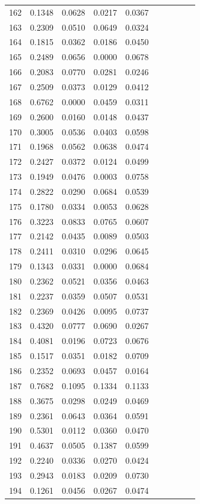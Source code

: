 \begin{table}
\begin{tabular}{cccccccccc}
162& 0.1348& 0.0628& 0.0217& 0.0367\\ 
163& 0.2309& 0.0510& 0.0649& 0.0324\\ 
164& 0.1815& 0.0362& 0.0186& 0.0450\\ 
165& 0.2489& 0.0656& 0.0000& 0.0678\\ 
166& 0.2083& 0.0770& 0.0281& 0.0246\\ 
167& 0.2509& 0.0373& 0.0129& 0.0412\\ 
168& 0.6762& 0.0000& 0.0459& 0.0311\\ 
169& 0.2600& 0.0160& 0.0148& 0.0437\\ 
170& 0.3005& 0.0536& 0.0403& 0.0598\\ 
171& 0.1968& 0.0562& 0.0638& 0.0474\\ 
172& 0.2427& 0.0372& 0.0124& 0.0499\\ 
173& 0.1949& 0.0476& 0.0003& 0.0758\\ 
174& 0.2822& 0.0290& 0.0684& 0.0539\\ 
175& 0.1780& 0.0334& 0.0053& 0.0628\\ 
176& 0.3223& 0.0833& 0.0765& 0.0607\\ 
177& 0.2142& 0.0435& 0.0089& 0.0503\\ 
178& 0.2411& 0.0310& 0.0296& 0.0645\\ 
179& 0.1343& 0.0331& 0.0000& 0.0684\\ 
180& 0.2362& 0.0521& 0.0356& 0.0463\\ 
181& 0.2237& 0.0359& 0.0507& 0.0531\\ 
182& 0.2369& 0.0426& 0.0095& 0.0737\\ 
183& 0.4320& 0.0777& 0.0690& 0.0267\\ 
184& 0.4081& 0.0196& 0.0723& 0.0676\\ 
185& 0.1517& 0.0351& 0.0182& 0.0709\\ 
186& 0.2352& 0.0693& 0.0457& 0.0164\\ 
187& 0.7682& 0.1095& 0.1334& 0.1133\\ 
188& 0.3675& 0.0298& 0.0249& 0.0469\\ 
189& 0.2361& 0.0643& 0.0364& 0.0591\\ 
190& 0.5301& 0.0112& 0.0360& 0.0470\\ 
191& 0.4637& 0.0505& 0.1387& 0.0599\\ 
192& 0.2240& 0.0336& 0.0270& 0.0424\\ 
193& 0.2943& 0.0183& 0.0209& 0.0730\\ 
194& 0.1261& 0.0456& 0.0267& 0.0474\\ 

\end{tabular}
\end{table}
